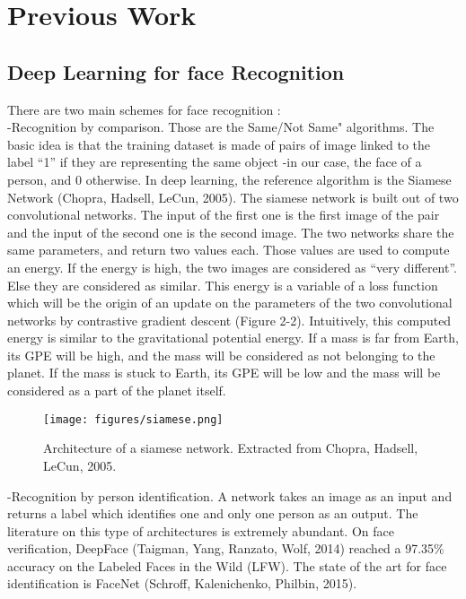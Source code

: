 \section{Previous Work}
\subsection{Deep Learning for face Recognition}
There are two main schemes for face recognition :\\
-Recognition by comparison. Those are the Same/Not Same" algorithms. The basic idea is that the training dataset is made of pairs of image linked to the label \enquote{1} if they are representing the same object -in our case, the face of a person, and 0 otherwise. In deep learning, the reference algorithm is the Siamese Network (Chopra, Hadsell, LeCun, 2005). The siamese network is built out of two convolutional networks. The input of the first one is the first image of the pair and the input of the second one is the second image. The two networks share the same parameters, and return two values each. Those values are used to compute an energy. If the energy is high, the two images are considered as \enquote{very different}. Else they are considered as similar. This energy is a variable of a loss function which will be the origin of an update on the parameters of the two convolutional networks by contrastive gradient descent (Figure 2-2). Intuitively, this computed energy is similar to the gravitational potential energy. If a mass is far from Earth, its GPE will be high, and the mass will be considered as not belonging to the planet. If the mass is stuck to Earth, its GPE will be low and the mass will be considered as a part of the planet itself.


\begin{figure}[!ht]
  \centering
  \texttt{[image: figures/siamese.png]}  
  \caption[Architecture of a siamese network. Extracted from Chopra, Hadsell, LeCun, 2005.]{Architecture of a siamese network. Extracted from Chopra, Hadsell, LeCun, 2005.}
  \protect\label{fig:Siamese}
\end{figure}

-Recognition by person identification. A network takes an image as an input and returns a label which identifies one and only one person as an output. The literature on this type of architectures is extremely abundant. On face verification, DeepFace (Taigman, Yang, Ranzato, Wolf, 2014) reached a 97.35\% accuracy on the Labeled Faces in the Wild (LFW). The state of the art for face identification is FaceNet (Schroff, Kalenichenko, Philbin, 2015).

